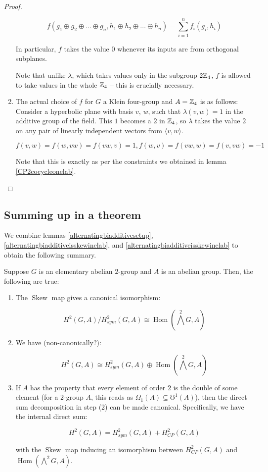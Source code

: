 \documentclass[10pt]{amsart}
\newcommand{\Skew}{\operatorname{Skew}}
\begin{document}
\begin{proof}
\begin{enumerate}
    $$f(g_1 \oplus g_2 \oplus \dots \oplus g_n, h_1 \oplus h_2 \oplus \dots \oplus h_n) = \sum_{i=1}^n f_i(g_i,h_i)$$

    In particular, $f$ takes the value $0$ whenever its inputs are
    from orthogonal subplanes.

    Note that unlike $\lambda$, which takes values only in the
    subgroup $2\mathbb{Z}_4$, $f$ is allowed to take values in the whole $\mathbb{Z}_4$ -- this is crucially necessary.
  \item The actual choice of $f$ for $G$ a Klein four-group and $A =
    \mathbb{Z}_4$ is as follows: Consider a hyperbolic plane with basis $v$,
    $w$, such that $\lambda(v,w) = 1$ in the additive group of the
    field. This $1$ becomes a $2$ in $\mathbb{Z}_4$, so $\lambda$ takes the
    value $2$ on any pair of linearly independent vectors from
    $\langle v, w \rangle$.

    $$f(v,w) = f(w,vw) = f(vw,v) = 1, f(w,v) = f(vw,w) = f(v,vw) = -1$$

    Note that this is exactly as per the constraints we obtained in
    lemma \ref{CP2cocycleonelab}.
  \end{enumerate}
\end{proof}

\subsection{Summing up in a theorem}

We combine lemmas \ref{alternatingbiadditivesetup},
\ref{alternatingbiadditiveisskewinelab}, and
\ref{alternatingbiadditiveisskewinelab} to obtain the following summary.

\begin{theorem}\label{elabsummary}
  Suppose $G$ is an elementary abelian $2$-group and $A$ is an abelian
  group. Then, the following are true:

  \begin{enumerate}
  \item The $\Skew$ map gives a canonical isomorphism:

    $$H^2(G,A)/H^2_{sym}(G,A) \cong \operatorname{Hom}(\bigwedge^2G,A)$$
  \item We have (non-canonically?):

    $$H^2(G,A) \cong H^2_{sym}(G,A) \oplus \operatorname{Hom}(\bigwedge^2G,A)$$
  \item If $A$ has the property that every element of order $2$ is the
    double of some element (for a $2$-group $A$, this reads as
    $\Omega_1(A) \subseteq \mho^1(A)$), then the direct sum
    decomposition in step (2) can be made canonical. Specifically, we
    have the internal direct sum:

    $$H^2(G,A) = H^2_{sym}(G,A) + H^2_{CP}(G,A)$$

    with the $\Skew$ map inducing an isomorphism between
    $H^2_{CP}(G,A)$ and $\operatorname{Hom}(\bigwedge^2G,A)$.
  \end{enumerate}
\end{theorem}
\end{document}
